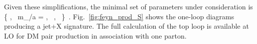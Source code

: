 Given these simplifications, the minimal set of parameters under consideration is
 \bea
  \left\{ \mDM,~ m_{\phi/a} = \mMed,~ \gdm,~ \gq \right\} \,.
 \eea
Fig.~\ref{fig:feyn_prod_S} shows the one-loop diagrams producing a jet+X signature. 
The full calculation of the top loop is available at LO for DM pair production in association 
with one parton. 




